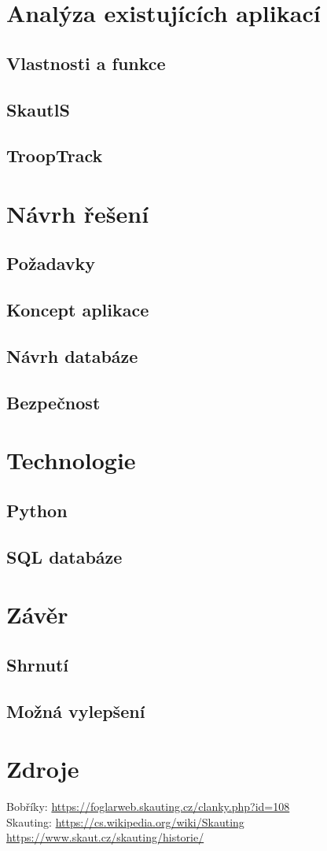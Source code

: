 \documentclass{article}
\begin{document}
\section{Analýza existujících aplikací}
\subsection{Vlastnosti a funkce}
\subsection{SkautlS}
\subsection{TroopTrack}

\section{Návrh řešení}
\subsection{Požadavky}
\subsection{Koncept aplikace}
\subsection{Návrh databáze}
\subsection{Bezpečnost}

\section{Technologie}
\subsection{Python}
\subsection{SQL databáze}

\section{Závěr}
\subsection{Shrnutí}
\subsection{Možná vylepšení}

\section{Zdroje}
Bobříky: \url{https://foglarweb.skauting.cz/clanky.php?id=108} \\
Skauting: \url{https://cs.wikipedia.org/wiki/Skauting} \\
          \url{https://www.skaut.cz/skauting/historie/}
\end{document}
